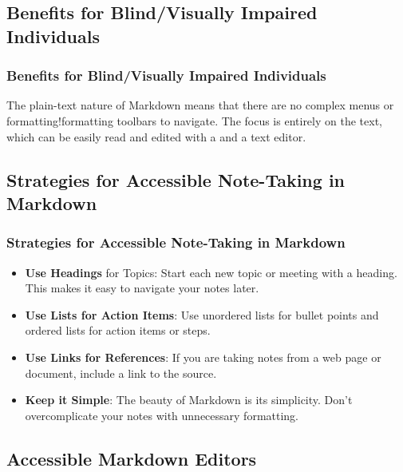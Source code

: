 \subsection{Benefits for Blind/Visually Impaired Individuals}
\label{subsec:notetaking-benefits-vi}
\subsubsection{Benefits for Blind/Visually Impaired Individuals}
\label{ssubsec:notetaking-benefits-vi-details}
The plain-text nature of Markdown means that there are no complex menus or formatting!formatting toolbars to navigate. The focus is entirely on the text, which can be easily read and edited with a  and a text editor.

\subsection{Strategies for Accessible Note-Taking in Markdown}
\label{subsec:accessible-notetaking-strategies}
\subsubsection{Strategies for Accessible Note-Taking in Markdown}
\label{ssubsec:accessible-notetaking-strategies-details}
\begin{itemize}
	\item \textbf{Use Headings} for Topics: Start each new topic or meeting with a heading. This makes it easy to navigate your notes later.
	\item \textbf{Use Lists for Action Items}: Use unordered lists for bullet points and ordered lists for action items or steps.
	\item \textbf{Use Links for References}: If you are taking notes from a web page or document, include a link to the source.
	\item \textbf{Keep it Simple}: The beauty of Markdown is its simplicity. Don't overcomplicate your notes with unnecessary formatting.
\end{itemize}

\subsection{Accessible Markdown Editors}
\label{subsec:accessible-markdown-editors}
